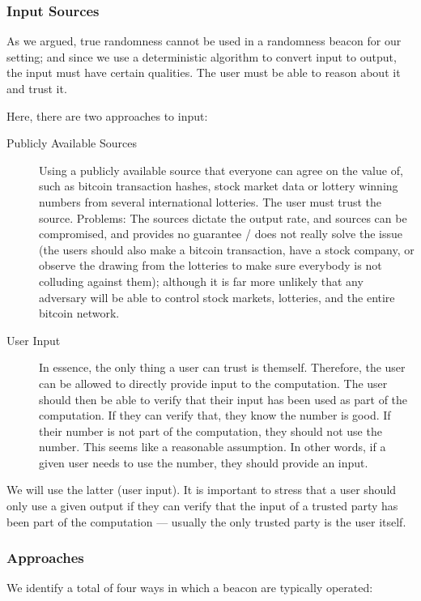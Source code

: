 \subsubsection{Input Sources}
As we argued, true randomness cannot be used in a randomness beacon for our setting;
and since we use a deterministic algorithm to convert input to output, the input must have certain qualities.
The user must be able to reason about it and trust it.

Here, there are two approaches to input:

\begin{description}
    \item[Publicly Available Sources] Using a publicly available source that everyone can agree on the value of, such as bitcoin transaction hashes, stock market data or lottery winning numbers from several international lotteries.
The user must trust the source.
Problems: The sources dictate the output rate, and sources can be compromised, and provides no guarantee / does not really solve the issue (the users should also make a bitcoin transaction, have a stock company, or observe the drawing from the lotteries to make sure everybody is not colluding against them); although it is far more unlikely that any adversary will be able to control stock markets, lotteries, and the entire bitcoin network.

    \item[User Input] In essence, the only thing a user can trust is themself.
Therefore, the user can be allowed to directly provide input to the computation.
The user should then be able to verify that their input has been used as part of the computation.
If they can verify that, they know the number is good.
If their number is not part of the computation, they should not use the number.
This seems like a reasonable assumption.
In other words, if a given user needs to use the number, they should provide an input.
\end{description}

We will use the latter (user input).
It is important to stress that a user should only use a given output if they can verify that the input of a trusted party has been part of the computation --- usually the only trusted party is the user itself.

\subsubsection{Approaches}
We identify a total of four ways in which a beacon are typically operated:


